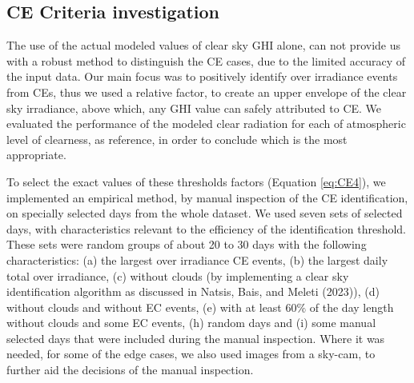 \documentclass[
]{article}
\begin{document}
\hypertarget{ce-criteria-investigation}{%
\subsection{CE Criteria investigation}\label{ce-criteria-investigation}}

The use of the actual modeled values of clear sky GHI alone, can not provide us with
a robust method to distinguish the CE cases, due to the limited accuracy of the input
data. Our main focus was to positively identify over irradiance events from CEs, thus
we used a relative factor, to create an upper envelope of the clear sky irradiance,
above which, any GHI value can safely attributed to CE. We evaluated the performance
of the modeled clear radiation for each of atmospheric level of clearness, as
reference, in order to conclude which is the most appropriate.

To select the exact values of these thresholds factors (Equation \ref{eq:CE4}), we
implemented an empirical method, by manual inspection of the CE identification, on
specially selected days from the whole dataset. We used seven sets of selected days,
with characteristics relevant to the efficiency of the identification threshold.
These sets were random groups of about 20 to 30 days with the following
characteristics:
(a) the largest over irradiance CE events,
(b) the largest daily total over irradiance,
(c) without clouds (by implementing a clear sky identification algorithm as discussed in Natsis, Bais, and Meleti (2023)),
(d) without clouds and without EC events,
(e) with at least \(60\%\) of the day length without clouds and some EC events,
(h) random days and
(i) some manual selected days that were included during the manual inspection.
Where it was needed, for some of the edge cases, we also used images from a sky-cam,
to further aid the decisions of the manual inspection.
\end{document}

